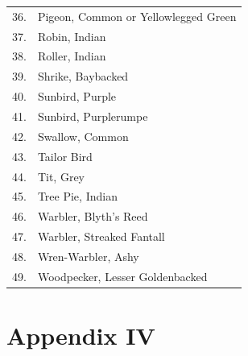 \begin{longtable}{cl}
36. &Pigeon, Common or Yellowlegged Green \\
37. &Robin, Indian \\
38.& Roller, Indian \\
39.&  Shrike, Baybacked \\
40.& Sunbird, Purple \\
41.& Sunbird, Purplerumpe \\
42.& Swallow, Common \\
43.& Tailor Bird \\
44.& Tit, Grey \\
45.& Tree Pie, Indian \\
46.& Warbler, Blyth's Reed \\
47.& Warbler, Streaked Fantall \\
48.& Wren-Warbler, Ashy \\
49.& Woodpecker, Lesser Goldenbacked 
\end{longtable}


\newpage

\chapter*{Appendix IV}

